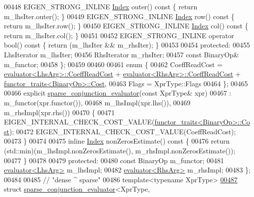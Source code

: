 \begin{DoxyCode}
00448     EIGEN\_STRONG\_INLINE \hyperlink{namespace_eigen_a62e77e0933482dafde8fe197d9a2cfde}{Index} outer()\textcolor{keyword}{ const }\{ \textcolor{keywordflow}{return} m\_lhsIter.outer(); \}
00449     EIGEN\_STRONG\_INLINE \hyperlink{namespace_eigen_a62e77e0933482dafde8fe197d9a2cfde}{Index} row()\textcolor{keyword}{ const }\{ \textcolor{keywordflow}{return} m\_lhsIter.row(); \}
00450     EIGEN\_STRONG\_INLINE \hyperlink{namespace_eigen_a62e77e0933482dafde8fe197d9a2cfde}{Index} col()\textcolor{keyword}{ const }\{ \textcolor{keywordflow}{return} m\_lhsIter.col(); \}
00451 
00452     EIGEN\_STRONG\_INLINE \textcolor{keyword}{operator} bool()\textcolor{keyword}{ const }\{ \textcolor{keywordflow}{return} (m\_lhsIter && m\_rhsIter); \}
00453 
00454   \textcolor{keyword}{protected}:
00455     LhsIterator m\_lhsIter;
00456     RhsIterator m\_rhsIter;
00457     \textcolor{keyword}{const} BinaryOp& m\_functor;
00458   \};
00459   
00460   
00461   \textcolor{keyword}{enum} \{
00462     CoeffReadCost = \hyperlink{struct_eigen_1_1internal_1_1evaluator}{evaluator<LhsArg>::CoeffReadCost} + 
      \hyperlink{struct_eigen_1_1internal_1_1evaluator}{evaluator<RhsArg>::CoeffReadCost} + 
      \hyperlink{struct_eigen_1_1internal_1_1functor__traits}{functor\_traits<BinaryOp>::Cost},
00463     Flags = XprType::Flags
00464   \};
00465   
00466   \textcolor{keyword}{explicit} \hyperlink{struct_eigen_1_1internal_1_1sparse__conjunction__evaluator}{sparse\_conjunction\_evaluator}(\textcolor{keyword}{const} XprType& xpr)
00467     : m\_functor(xpr.functor()),
00468       m\_lhsImpl(xpr.lhs()), 
00469       m\_rhsImpl(xpr.rhs())  
00470   \{
00471     EIGEN\_INTERNAL\_CHECK\_COST\_VALUE(\hyperlink{struct_eigen_1_1internal_1_1functor__traits}{functor\_traits<BinaryOp>::Cost});
00472     EIGEN\_INTERNAL\_CHECK\_COST\_VALUE(CoeffReadCost);
00473   \}
00474   
00475   \textcolor{keyword}{inline} \hyperlink{namespace_eigen_a62e77e0933482dafde8fe197d9a2cfde}{Index} nonZerosEstimate()\textcolor{keyword}{ const }\{
00476     \textcolor{keywordflow}{return} (std::min)(m\_lhsImpl.nonZerosEstimate(), m\_rhsImpl.nonZerosEstimate());
00477   \}
00478 
00479 \textcolor{keyword}{protected}:
00480   \textcolor{keyword}{const} BinaryOp m\_functor;
00481   \hyperlink{struct_eigen_1_1internal_1_1evaluator}{evaluator<LhsArg>} m\_lhsImpl;
00482   \hyperlink{struct_eigen_1_1internal_1_1evaluator}{evaluator<RhsArg>} m\_rhsImpl;
00483 \};
00484 
00485 \textcolor{comment}{// "dense ^ sparse"}
00486 \textcolor{keyword}{template}<\textcolor{keyword}{typename} XprType>
\hyperlink{struct_eigen_1_1internal_1_1sparse__conjunction__evaluator_3_01_xpr_type_00_01_index_based_00_01_iterator_based_01_4}{00487} \textcolor{keyword}{struct }\hyperlink{struct_eigen_1_1internal_1_1sparse__conjunction__evaluator}{sparse\_conjunction\_evaluator}<XprType, 

\end{DoxyCode}
